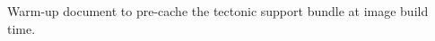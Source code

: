 \documentclass[letter,11pt]{article}
\begin{document}
\pagestyle{empty}\printheader
Warm-up document to pre-cache the tectonic support bundle at image build time.
\end{document}

